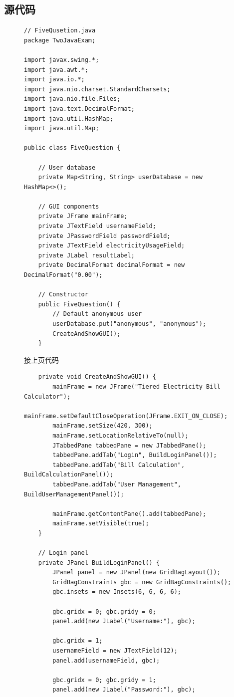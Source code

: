 \documentclass[12pt,a4paper]{article}
\begin{document}
\subsection*{源代码}
\begin{figure}[H]
\centering
\begin{lstlisting}
// FiveQusetion.java
package TwoJavaExam;

import javax.swing.*;
import java.awt.*;
import java.io.*;
import java.nio.charset.StandardCharsets;
import java.nio.file.Files;
import java.text.DecimalFormat;
import java.util.HashMap;
import java.util.Map;

public class FiveQuestion {

    // User database
    private Map<String, String> userDatabase = new HashMap<>();

    // GUI components
    private JFrame mainFrame;
    private JTextField usernameField;
    private JPasswordField passwordField;
    private JTextField electricityUsageField;
    private JLabel resultLabel;
    private DecimalFormat decimalFormat = new DecimalFormat("0.00");

    // Constructor
    public FiveQuestion() {
        // Default anonymous user
        userDatabase.put("anonymous", "anonymous");
        CreateAndShowGUI();
    }
\end{lstlisting}
\end{figure}
\begin{figure}[H]
接上页代码
\begin{lstlisting}
    private void CreateAndShowGUI() {
        mainFrame = new JFrame("Tiered Electricity Bill Calculator");
        mainFrame.setDefaultCloseOperation(JFrame.EXIT_ON_CLOSE);
        mainFrame.setSize(420, 300);
        mainFrame.setLocationRelativeTo(null);
        JTabbedPane tabbedPane = new JTabbedPane();
        tabbedPane.addTab("Login", BuildLoginPanel());
        tabbedPane.addTab("Bill Calculation", BuildCalculationPanel());
        tabbedPane.addTab("User Management", BuildUserManagementPanel());

        mainFrame.getContentPane().add(tabbedPane);
        mainFrame.setVisible(true);
    }

    // Login panel
    private JPanel BuildLoginPanel() {
        JPanel panel = new JPanel(new GridBagLayout());
        GridBagConstraints gbc = new GridBagConstraints();
        gbc.insets = new Insets(6, 6, 6, 6);

        gbc.gridx = 0; gbc.gridy = 0;
        panel.add(new JLabel("Username:"), gbc);

        gbc.gridx = 1;
        usernameField = new JTextField(12);
        panel.add(usernameField, gbc);

        gbc.gridx = 0; gbc.gridy = 1;
        panel.add(new JLabel("Password:"), gbc);
\end{lstlisting}
\end{figure}
\end{document}
